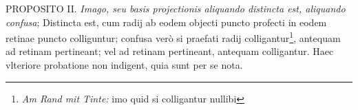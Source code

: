  \pend \vspace{3.0ex} \pstart \centering [p.~5]  PROPOSITO II.  \pend \vspace{1.0ex}\pstart \textit{Imago, seu basis projectionis aliquando distincta est, aliquando confusa}; Distincta est, cum radij\protect{} ab eodem objecti puncto profecti in eodem retinae\protect{} puncto colliguntur; confusa ver\`{o} si praefati radij\protect{} colligantur\footnote{\textit{Am Rand mit Tinte:} imo quid si colligantur nullibi}, antequam ad retinam\protect{} pertineant; vel ad retinam\protect{} pertineant, antequam colligantur. Haec vlteriore probatione non indigent, quia sunt per se nota.